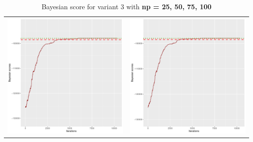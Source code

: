 \documentclass[]{scrartcl}
\begin{document}
\begin{table}[h!]
\begin{tabular}{cc}
\includegraphics[scale = 0.4]{./figs/hepar2/v3/75/bayBoundsEvolution-10352.pdf} & 
\includegraphics[scale = 0.4]{./figs/hepar2/v3/100/bayBoundsEvolution-10352.pdf} \\
\end{tabular}
\caption{Bayesian score for variant 3 with \textbf{np =  25, 50, 75, 100}}
\end{table}
\end{document}
